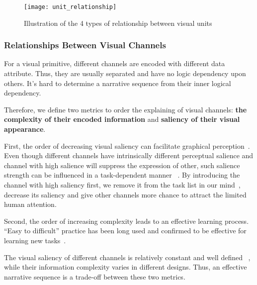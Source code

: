 \begin{figure}[tb]
 \centering %
 \texttt{[image: unit\_relationship]}
 \caption{Illustration of the 4 types of relationship between visual units}
 \label{fig:relationship}
\end{figure}

\subsubsection{Relationships Between Visual Channels}
For a visual primitive, different channels are encoded with different data attribute. Thus, they are usually separated and have no logic dependency upon others. It's hard to determine a narrative sequence from their inner logical dependency. 

Therefore, we define two metrics to order the explaining of visual channels: \textbf{the complexity of their encoded information} and \textbf{saliency of their visual appearance}.

First, the order of decreasing visual saliency can facilitate graphical perception~\cite{cleveland_graphical_1984}. Even though different channels have intrinsically different perceptual salience and channel with high salience will suppress the expression of other, such salience strength can be influenced in a task-dependent manner ~\cite{nothdurft_salience_2000}. By introducing the channel with high saliency first, we remove it from the task list in our mind~\cite{itti2001computational}, decrease its saliency and give other channels more chance to attract the limited human attention. 

Second, the order of increasing complexity leads to an effective learning process. “Easy to difficult” practice has been long used and confirmed to be effective for learning new tasks~\cite{bliss_effects_1992}.
 
The visual saliency of different channels is relatively constant and  well defined ~\cite{munzner_visualization_2014,cleveland_graphical_1984}, while their information complexity varies in different designs. Thus, an effective narrative sequence is a trade-off between these two metrics. 


